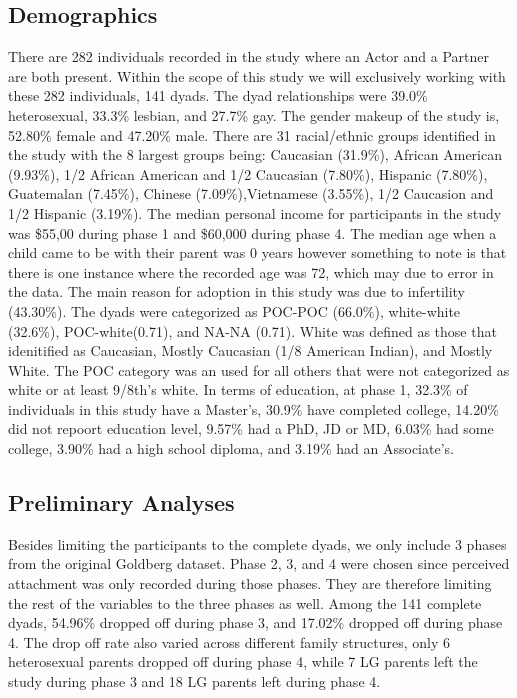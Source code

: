 \documentclass[man]{apa6}
\begin{document}
\hypertarget{demographics}{%
\subsection{Demographics}\label{demographics}}

There are 282 individuals recorded in the study where an Actor and a Partner are both present. Within the scope of this study we will exclusively working with these 282 individuals, 141 dyads.
The dyad relationships were 39.0\% heterosexual, 33.3\% lesbian, and 27.7\% gay.
The gender makeup of the study is, 52.80\% female and 47.20\% male.
There are 31 racial/ethnic groups identified in the study with the 8 largest groups being: Caucasian (31.9\%), African American (9.93\%), 1/2 African American and 1/2 Caucasian (7.80\%), Hispanic (7.80\%), Guatemalan (7.45\%), Chinese (7.09\%),Vietnamese (3.55\%), 1/2 Caucasion and 1/2 Hispanic (3.19\%).
The median personal income for participants in the study was \$55,00 during phase 1 and \$60,000 during phase 4.
The median age when a child came to be with their parent was 0 years however something to note is that there is one instance where the recorded age was 72, which may due to error in the data.
The main reason for adoption in this study was due to infertility (43.30\%).
The dyads were categorized as POC-POC (66.0\%), white-white (32.6\%), POC-white(0.71), and NA-NA (0.71). White was defined as those that idenitified as Caucasian, Mostly Caucasian (1/8 American Indian), and Mostly White. The POC category was an used for all others that were not categorized as white or at least 9/8th's white.
In terms of education, at phase 1, 32.3\% of individuals in this study have a Master's, 30.9\% have completed college, 14.20\% did not repoort education level, 9.57\% had a PhD, JD or MD, 6.03\% had some college, 3.90\% had a high school diploma, and 3.19\% had an Associate's.

\hypertarget{preliminary-analyses}{%
\subsection{Preliminary Analyses}\label{preliminary-analyses}}

Besides limiting the participants to the complete dyads, we only include 3 phases from the original Goldberg dataset. Phase 2, 3, and 4 were chosen since perceived attachment was only recorded during those phases. They are therefore limiting the rest of the variables to the three phases as well. Among the 141 complete dyads, 54.96\% dropped off during phase 3, and 17.02\% dropped off during phase 4. The drop off rate also varied across different family structures, only 6 heterosexual parents dropped off during phase 4, while 7 LG parents left the study during phase 3 and 18 LG parents left during phase 4.
\end{document}
